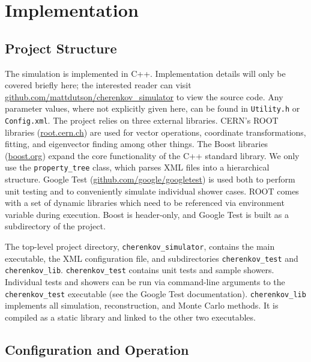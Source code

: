 \section{Implementation}

\subsection{Project Structure}

The simulation is implemented in C++. Implementation details will only be covered briefly here; the interested reader can visit \url{github.com/mattdutson/cherenkov_simulator} to view the source code. Any parameter values, where not explicitly given here, can be found in \texttt{Utility.h} or \texttt{Config.xml}. The project relies on three external libraries. CERN's ROOT libraries (\url{root.cern.ch}) are used for vector operations, coordinate transformations, fitting, and eigenvector finding among other things. The Boost libraries (\url{boost.org}) expand the core functionality of the C++ standard library. We only use the \texttt{property\_tree} class, which parses XML files into a hierarchical structure. Google Test (\url{github.com/google/googletest}) is used both to perform unit testing and to conveniently simulate individual shower cases. ROOT comes with a set of dynamic libraries which need to be referenced via environment variable during execution. Boost is header-only, and Google Test is built as a subdirectory of the project.

The top-level project directory, \texttt{cherenkov\_simulator}, contains the main executable, the XML configuration file, and subdirectories \texttt{cherenkov\_test} and \texttt{cherenkov\_lib}. \texttt{cherenkov\_test} contains unit tests and sample showers. Individual tests and showers can be run via command-line arguments to the \texttt{cherenkov\_test} executable (see the Google Test documentation). \texttt{cherenkov\_lib} implements all simulation, reconstruction, and Monte Carlo methods. It is compiled as a static library and linked to the other two executables.

\subsection{Configuration and Operation}

